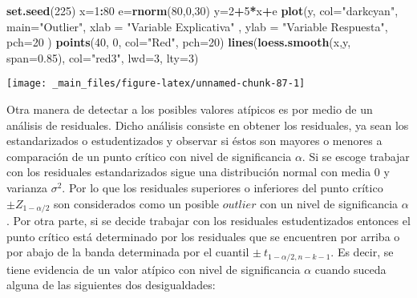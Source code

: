 \documentclass[a4paper,oneside,openany]{book}
\newenvironment{Shaded}{\begin{snugshade}}{\end{snugshade}}
\newcommand{\KeywordTok}[1]{\textcolor[rgb]{0.13,0.29,0.53}{\textbf{#1}}}
\newcommand{\DataTypeTok}[1]{\textcolor[rgb]{0.13,0.29,0.53}{#1}}
\newcommand{\DecValTok}[1]{\textcolor[rgb]{0.00,0.00,0.81}{#1}}
\newcommand{\FloatTok}[1]{\textcolor[rgb]{0.00,0.00,0.81}{#1}}
\newcommand{\StringTok}[1]{\textcolor[rgb]{0.31,0.60,0.02}{#1}}
\newcommand{\OperatorTok}[1]{\textcolor[rgb]{0.81,0.36,0.00}{\textbf{#1}}}
\newcommand{\NormalTok}[1]{#1}
\begin{document}
\begin{Shaded}
\begin{Highlighting}[]
\KeywordTok{set.seed}\NormalTok{(}\DecValTok{225}\NormalTok{)}
\NormalTok{x=}\DecValTok{1}\OperatorTok{:}\DecValTok{80} 
\NormalTok{e=}\KeywordTok{rnorm}\NormalTok{(}\DecValTok{80}\NormalTok{,}\DecValTok{0}\NormalTok{,}\DecValTok{30}\NormalTok{)}
\NormalTok{y=}\DecValTok{2}\OperatorTok{+}\DecValTok{5}\OperatorTok{*}\NormalTok{x}\OperatorTok{+}\NormalTok{e}
\KeywordTok{plot}\NormalTok{(y,  }\DataTypeTok{col=}\StringTok{"darkcyan"}\NormalTok{, }\DataTypeTok{main=}\StringTok{"Outlier"}\NormalTok{, }\DataTypeTok{xlab =} \StringTok{"Variable Explicativa"}\NormalTok{ , }
     \DataTypeTok{ylab =} \StringTok{"Variable Respuesta"}\NormalTok{, }\DataTypeTok{pch=}\DecValTok{20}\NormalTok{ ) }
\KeywordTok{points}\NormalTok{(}\DecValTok{40}\NormalTok{, }\DecValTok{0}\NormalTok{, }\DataTypeTok{col=}\StringTok{"Red"}\NormalTok{, }\DataTypeTok{pch=}\DecValTok{20}\NormalTok{) }
\KeywordTok{lines}\NormalTok{(}\KeywordTok{loess.smooth}\NormalTok{(x,y, }\DataTypeTok{span=}\FloatTok{0.85}\NormalTok{), }\DataTypeTok{col=}\StringTok{"red3"}\NormalTok{, }\DataTypeTok{lwd=}\DecValTok{3}\NormalTok{, }\DataTypeTok{lty=}\DecValTok{3}\NormalTok{)}
\end{Highlighting}
\end{Shaded}

\begin{center}\texttt{[image: \_main\_files/figure-latex/unnamed-chunk-87-1]} \end{center}

Otra manera de detectar a los posibles valores atípicos es por medio de
un análisis de residuales. Dicho análisis consiste en obtener los
residuales, ya sean los estandarizados o estudentizados y observar si
éstos son mayores o menores a comparación de un punto crítico con nivel
de significancia \(\alpha\). Si se escoge trabajar con los residuales
estandarizados sigue una distribución normal con media 0 y varianza
\(\sigma^2\). Por lo que los residuales superiores o inferiores del
punto crítico \(\pm Z_{1-\alpha/2}\) son considerados como un posible
\(outlier\) con un nivel de significancia \(\alpha\). Por otra parte, si
se decide trabajar con los residuales estudentizados entonces el punto
crítico está determinado por los residuales que se encuentren por arriba
o por abajo de la banda determinada por el cuantil
\(\pm \ t_{1-\alpha/2,n-k-1}.\) Es decir, se tiene evidencia de un valor
atípico con nivel de significancia \(\alpha\) cuando suceda alguna de
las siguientes dos desigualdades:
\end{document}
